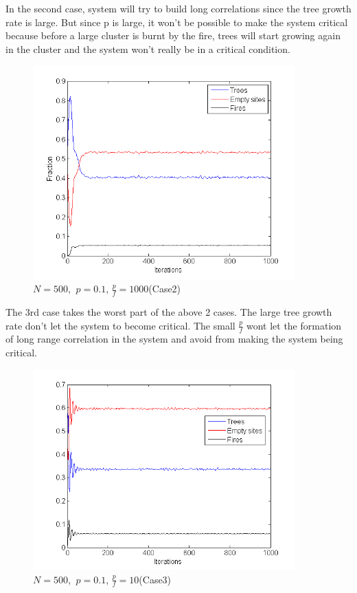 \documentclass[11pt]{article}
\begin{document}
In the second case, system will try to build long correlations since the tree growth rate is large. But since p is large, it won't be possible to make the system critical because before a large cluster is burnt by the fire, trees will start growing again in the cluster and the system won't really be in a critical condition.\\

\begin{figure}[H]
\centering
\includegraphics[width=0.9\textwidth,keepaspectratio=true,]{Pictures/case2_size500_1000iter_p_0point1_ratio_1000.png}
\caption{$N=500$, $\ p=0.1$, $\frac{p}{f}=1000$(Case2)}
\end{figure}

The 3rd case takes the worst part of the above 2 cases. The large tree growth rate don't let the system to become critical. The small $\frac{p}{f}$ wont let the formation of long range correlation in the system and avoid from making the system being critical.\\
\begin{figure}[H]
\centering
\includegraphics[width=0.9\textwidth,keepaspectratio=true,]{Pictures/case3_size500_1000iter_p_0point1_ratio_10.png}
\caption{$N=500$, $\ p=0.1$, $\frac{p}{f}=10$(Case3)}
\end{figure}
\end{document}
